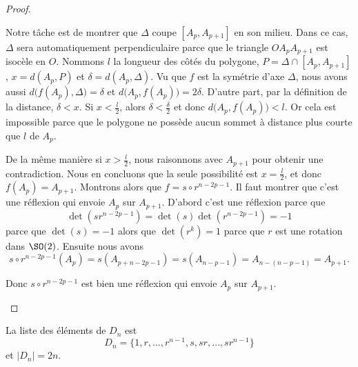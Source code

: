 \begin{proof}
\begin{enumerate}
            Notre tâche est de montrer que \( \Delta\) coupe \( [A_p,A_{p+1}]\) en son milieu. Dans ce cas, \( \Delta\) sera automatiquement perpendiculaire parce que le triangle \( OA_pA_{p+1}\) est isocèle en \( O\). Nommons \( l\) la longueur des côtés du polygone, \( P=\Delta\cap[A_p,A_{p+1}]\), \( x=d(A_p,P)\) et \( \delta=d(A_p,\Delta)\). Vu que \( f\) est la symétrie d'axe \( \Delta\), nous avons aussi \( d\big( f(A_p),\Delta \big)=\delta\) et \( d\big( A_p,f(A_p) \big)=2\delta\). D'autre part, par la définition de la distance, \( \delta<x\). Si \( x<\frac{ l }{2}\), alors \( \delta<\frac{ \delta }{2}\) et donc \( d\big( A_p,f(A_p) \big)<l\). Or cela est impossible parce que le polygone ne possède aucun sommet à distance plus courte que \( l\) de \( A_p\).

            De la même manière si \( x>\frac{ l }{2}\), nous raisonnons avec \( A_{p+1}\) pour obtenir une contradiction. Nous en concluons que la seule possibilité est \( x=\frac{ l }{2}\), et donc \( f(A_p)=A_{p+1}\). Montrons alors que \( f=s\circ r^{n-2p-1}\). Il faut montrer que c'est une réflexion qui envoie \( A_p\) sur \( A_{p+1}\). D'abord c'est une réflexion parce que
            \begin{equation}
                \det(sr^{n-2p-1})=\det(s)\det(r^{n-2p-1})=-1
            \end{equation}
            parce que \( \det(s)=-1\) alors que \( \det(r^k)=1\) parce que \( r\) est une rotation dans \( \SO(2)\). Ensuite nous avons
            \begin{equation}
                s\circ r^{n-2p-1}(A_p)=s(A_{p+n-2p-1})=s(A_{n-p-1})=A_{n-(n-p-1)}=A_{p+1}.
            \end{equation}

            Donc \( s\circ r^{n-2p-1}\) est bien une réflexion qui envoie \( A_p\) sur \( A_{p+1}\).

    \end{enumerate}
\end{proof}

\begin{corollary}   \label{CorWYITsWW}
La liste des éléments de \( D_n\) est 
\begin{equation}
    D_n=\{ 1,r,\ldots, r^{n-1},s,sr,\ldots, sr^{n-1} \}
\end{equation}
et \( | D_n |=2n\).
\end{corollary}

